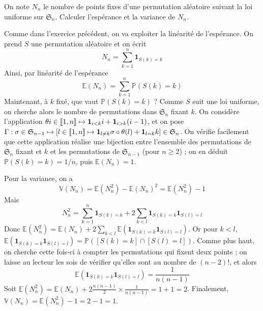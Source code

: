 \begin{exo}
    \label{probas2}
    On note $N_n$ le nombre de points fixes d'une permutation aléatoire suivant la loi uniforme sur $\mathfrak S_n$.
    Calculer l'espérance et la variance de $N_n$.
\end{exo}

\begin{solution}
    Comme dans l'exercice précédent, on va exploiter la linéarité de l'espérance. 
    On prend $S$ une permutation aléatoire et on écrit 
    \[
        N_n=\sum_{k=1}^n\mathbf1_{S(k)=k}
    \]
    Ainsi, par linéarité de l'espérance
    \[
        \mathbb E(N_n)=\sum_{k=1}^n \mathbb P(S(k)=k)
    \]
    Maintenant, à $k$ fixé, que vaut $\mathbb P(S(k)=k)$ ?
    Comme $S$ suit une loi uniforme, on cherche alors le nombre de permutations dans $\mathfrak S_n$ fixant $k$. 
    On considère l'application $\theta i\in[\![1,n]\!]\mapsto \mathbf1_{i<k}i+\mathbf1_{i > k}(i-1)$, et on pose 
    $\Gamma : \sigma \in \mathfrak S_{n-1}\mapsto [l\in[\![1,n]\!]\mapsto \mathbf1_{l\neq k}\sigma\circ\theta(l)+\mathbf1_{l=k}k]\in\mathfrak S_n$.
    On vérifie facilement que cette application réalise une bijection entre l'ensemble des permutations de $\mathfrak S_n$ fixant et $k$ et les permutations de $\mathfrak S_{n-1}$
    (pour $n\geq 2$) ; on en déduit $\mathbb P(S(k)=k)=1/n$, puis $\mathbb E(N_n)=1$.

    Pour la variance, on a 
    \[
        \mathbb V(N_n)=\mathbb E(N_n^2)-\mathbb E(N_n)^2=\mathbb E(N_n^2)-1
    \]
    Mais 
    \[
        N_n^2=\sum_{k=1}^n\mathbf1_{S(k)=k}+2\sum_{k<l}\mathbf1_{S(k)=k}\mathbf1_{S(l)=l}
    \]
    Donc $\mathbb E(N_n^2)=\mathbb E(N_n)+2\sum_{k<l}\mathbb E(\mathbf1_{S(k)=k}\mathbf1_{S(l)=l})$.
    Or pour $k<l$, $\mathbb E(\mathbf1_{S(k)=k}\mathbf1_{S(l)=l})=\mathbb P([S(k)=k]\cap[S(l)=l])$.
    Comme plus haut, on cherche cette fois-ci à compter les permutations qui fixent deux points ; on laisse 
    au lecteur les sois de vérifier qu'elles sont au nombre de $(n-2)!$, et alors 
    \[
        \mathbb E(\mathbf1_{S(k)=k}\mathbf1_{S(l)=l})=\frac1{n(n-1)}
    \]
    Soit $\mathbb E(N_n^2)=\mathbb E(N_n)+2\frac{n(n-1)}2\times\frac1{n(n-1)}=1+1=2$.
    Finalement, $\mathbb V(N_n)=\mathbb E(N_n^2)-1=2-1=1$.

\end{solution}